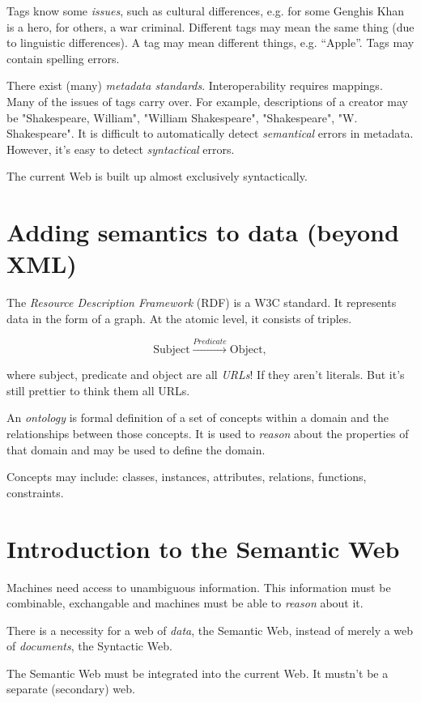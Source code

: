 \documentclass{report}
\begin{document}
Tags know some \emph{issues}, such as cultural differences,
e.g. for some Genghis Khan is a hero, for others, a war criminal.
Different tags may mean the same thing
(due to linguistic differences).
A tag may mean different things, e.g. ``Apple''.
Tags may contain spelling errors.

There exist (many) \emph{metadata standards}.
Interoperability requires mappings.
Many of the issues of tags carry over.
For example, descriptions of a creator may be
"Shakespeare, William", "William Shakespeare",
"Shakespeare", "W. Shakespeare".
It is difficult to automatically detect
\emph{semantical} errors in metadata.
However, it's easy to detect \emph{syntactical} errors.

The current Web is built up
almost exclusively syntactically.

\section{Adding semantics to data (beyond XML)}

The \emph{Resource Description Framework} (RDF) is a W3C standard.
It represents data in the form of a graph.
At the atomic level, it consists of triples.

$$\text{Subject} \xrightarrow{Predicate} \text{Object},$$

where subject, predicate and object are all \emph{URLs}!
If they aren't literals.
But it's still prettier to think them all URLs.

An \emph{ontology} is formal definition
of a set of concepts within a domain
and the relationships between those concepts.
It is used to \emph{reason}
about the properties of that domain
and may be used to define the domain.

Concepts may include:
classes, instances, attributes,
relations, functions, constraints.

\section{Introduction to the Semantic Web}

Machines need access to unambiguous information.
This information must be combinable, exchangable
and machines must be able to \emph{reason} about it.

There is a necessity for a web of \emph{data},
the Semantic Web,
instead of merely a web of \emph{documents},
the Syntactic Web.

The Semantic Web must be integrated into the current Web.
It mustn't be a separate (secondary) web.
\end{document}
